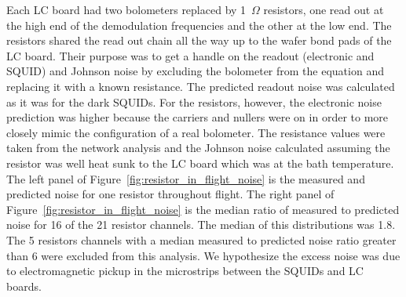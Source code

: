 Each \ac{LC} board had two bolometers replaced by 1~$\Omega$ resistors, one read out at the high end of the demodulation frequencies and the other at the low end. 
The resistors shared the read out chain all the way up to the wafer bond pads of the LC board. 
Their purpose was to get a handle on the readout (electronic and \ac{SQUID}) and Johnson noise by excluding the bolometer from the equation and replacing it with a known resistance. 
The predicted readout noise was calculated as it was for the dark \ac{SQUID}s. 
For the resistors, however, the electronic noise prediction was higher because the carriers and nullers were on in order to more closely mimic the configuration of a real bolometer. 
The resistance values were taken from the network analysis and the Johnson noise calculated assuming the resistor was well heat sunk to the \ac{LC} board which was at the bath temperature. 
The left panel of Figure~\ref{fig:resistor_in_flight_noise} is the measured and predicted noise for one resistor throughout flight. 
The right panel of Figure~\ref{fig:resistor_in_flight_noise} is the median ratio of measured to predicted noise for 16 of the 21 resistor channels.
The median of this distributions was 1.8.  
The 5 resistors channels with a median measured to predicted noise ratio greater than 6 were excluded from this analysis. 
We hypothesize the excess noise was due to electromagnetic pickup in the microstrips between the \ac{SQUID}s and \ac{LC} boards.


